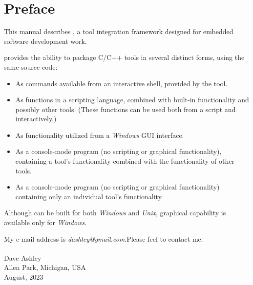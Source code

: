 \chapter{Preface}

This manual describes \emph{\productname{}}, a tool integration
framework designed for embedded software development work.

\emph{\productname{}} provides the ability to package C/C++ tools
in several distinct forms, using the same source code:

\begin{itemize}
      \item As commands available from an interactive shell, provided
            by the tool.
      \item As functions in a scripting language, combined 
            with built-in \emph{\productname{}} functionality and
            possibly other tools.  (These functions can be used
            both from a script and interactively.)
      \item As functionality utilized from a \emph{Windows} GUI interface.
      \item As a console-mode program (no scripting or graphical functionality),
            containing a tool's functionality combined with the functionality of
            other tools.
      \item As a console-mode program (no scripting or graphical functionality)
            containing only an individual tool's
            functionality.
\end{itemize}

Although \emph{\productname{}} can be built for both \emph{Windows} and
\emph{Unix}, graphical capability is available only for \emph{Windows}.

My e-mail address is \emph{dashley@gmail.com}.\@ Please feel
to contact me.
\\\\
\noindent\hspace*{2.5in}Dave Ashley\\
\noindent\hspace*{2.5in}Allen Park, Michigan, USA\\
\noindent\hspace*{2.5in}August, 2023
